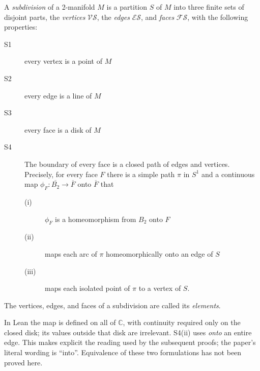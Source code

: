     \begin{definition}[Subdivision]\label{def:subdivision}
      \leanok
      A \emph{subdivision} of a 2-manifold $M$ is a partition $S$ of $M$ into
      three finite sets of disjoint parts, the \emph{vertices} $\mathscr{V}
      \mathscr{S}$, the \emph{edges} $\mathscr{E} \mathscr{S}$, and
      \emph{faces} $\mathscr{F} \mathscr{S}$, with the following properties:
      \begin{description}
        \item[S1] every vertex is a point of $M$

        \item[S2] every edge is a line of $M$

        \item[S3] every face is a disk of $M$

        \item[S4] The boundary of every face is a closed path of edges and
                  vertices. Precisely, for every face $F$ there is a
                  simple path $\pi$ in $S^1$ and a continuous map
                  $\phi_F : \overline{B_2} \to \overline{F}$ onto
                  $\overline F$ that
                  \begin{description}
                    \item[(i)] $\phi_F$ is a homeomorphism from $B_2$ onto $F$

                    \item[(ii)] maps each arc of $\pi$ homeomorphically onto an
                                edge of $S$

                    \item[(iii)] maps each isolated point of $\pi$ to a vertex
                                 of $S$.
                  \end{description}
      \end{description}
      The vertices, edges, and faces of a subdivision are called its
      \emph{elements}.
    \end{definition}

    In Lean the map is defined on all of $\mathbb C$, with continuity required
    only on the closed disk; its values outside that disk are irrelevant.
    S4(ii) uses \emph{onto} an entire edge. This makes explicit the reading
    used by the subsequent proofs; the paper's literal wording is ``into''.
    Equivalence of these two formulations has not been proved here.

